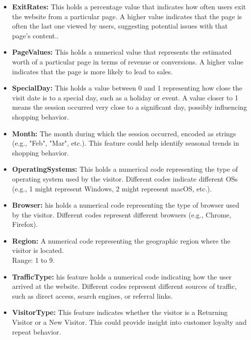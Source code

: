 \documentclass[12pt]{article}
\begin{document}
\begin{itemize}
\item \textbf{ExitRates:} This holds a percentage value that indicates how often users exit the website from a particular page. A higher value indicates that the page is often the last one viewed by users, suggesting potential issues with that page's content..

\item \textbf{PageValues:} This holds a numerical value that represents the estimated worth of a particular page in terms of revenue or conversions. A higher value indicates that the page is more likely to lead to sales.

\item \textbf{SpecialDay:} This holds a value between 0 and 1 representing how close the visit date is to a special day, such as a holiday or event. A value closer to 1 means the session occurred very close to a significant day, possibly influencing shopping behavior.

\item \textbf{Month:} The month during which the session occurred, encoded as strings (e.g., "Feb", "Mar", etc.). This feature could help identify seasonal trends in shopping behavior.

\item \textbf{OperatingSystems:} This holds a numerical code representing the type of operating system used by the visitor. Different codes indicate different OSs (e.g., 1 might represent Windows, 2 might represent macOS, etc.).

\item \textbf{Browser:} his holds a numerical code representing the type of browser used by the visitor. Different codes represent different browsers (e.g., Chrome, Firefox).

\item \textbf{Region:} A numerical code representing the geographic region where the visitor is located. \\
Range: 1 to 9.

\item \textbf{TrafficType:} his feature holds a numerical code indicating how the user arrived at the website. Different codes represent different sources of traffic, such as direct access, search engines, or referral links.

\item \textbf{VisitorType:} This feature indicates whether the visitor is a Returning Visitor or a New Visitor. This could provide insight into customer loyalty and repeat behavior.


\end{itemize}
\end{document}

